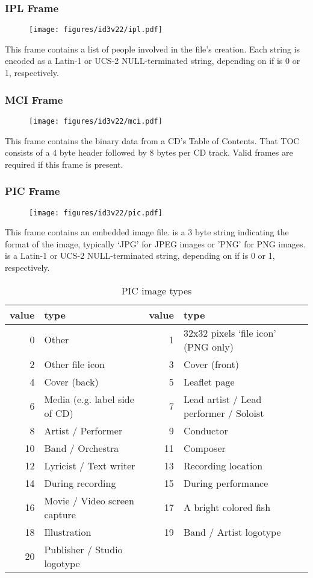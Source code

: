 \subsubsection{IPL Frame}
\begin{figure}[h]
\texttt{[image: figures/id3v22/ipl.pdf]}
\end{figure}
This frame contains a list of people involved in the file's creation.
Each string is encoded as a Latin-1 or UCS-2 NULL-terminated
string, depending on if  is 0 or 1, respectively.

\subsubsection{MCI Frame}
\begin{figure}[h]
\texttt{[image: figures/id3v22/mci.pdf]}
\end{figure}
This frame contains the binary data from a CD's Table of Contents.
That TOC consists of a 4 byte header followed by 8 bytes per CD track.
Valid  frames are required if this frame is present.

\clearpage

\subsubsection{PIC Frame}
\begin{figure}[h]
\texttt{[image: figures/id3v22/pic.pdf]}
\end{figure}
This frame contains an embedded image file.
 is a 3 byte string indicating the format of the image,
typically `JPG' for JPEG images or 'PNG' for PNG images.
 is a Latin-1 or UCS-2 NULL-terminated string,
depending on if  is 0 or 1, respectively.

\begin{table}[h]
{
\begin{tabular}{|r|l||r|l|}
\hline
value & type & value & type \\
\hline
0 & Other & 1 & 32x32 pixels `file icon' (PNG only) \\
2 & Other file icon & 3 & Cover (front) \\
4 & Cover (back) & 5 & Leaflet page \\
6 & Media (e.g. label side of CD) & 7 & Lead artist / Lead performer / Soloist \\
8 & Artist / Performer & 9 & Conductor \\
10 & Band / Orchestra & 11 & Composer \\
12 & Lyricist / Text writer & 13 & Recording location \\
14 & During recording & 15 & During performance \\
16 & Movie / Video screen capture & 17 & A bright colored fish \\
18 & Illustration & 19 & Band / Artist logotype \\
20 & Publisher / Studio logotype & &  \\
\hline
\end{tabular}
\caption{PIC image types}
}
\end{table}

